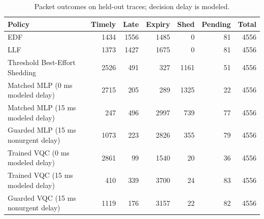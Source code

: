 \begin{table}[t]
\centering
\caption{Packet outcomes on held-out traces; decision delay is modeled.}
\begin{tabular}{lrrrrrr}
\toprule
Policy & Timely & Late & Expiry & Shed & Pending & Total \\
\midrule
EDF & 1434 & 1556 & 1485 & 0 & 81 & 4556 \\
LLF & 1373 & 1427 & 1675 & 0 & 81 & 4556 \\
Threshold Best-Effort Shedding & 2526 & 491 & 327 & 1161 & 51 & 4556 \\
Matched MLP (0 ms modeled delay) & 2715 & 205 & 289 & 1325 & 22 & 4556 \\
Matched MLP (15 ms modeled delay) & 247 & 496 & 2997 & 739 & 77 & 4556 \\
Guarded MLP (15 ms nonurgent delay) & 1073 & 223 & 2826 & 355 & 79 & 4556 \\
Trained VQC (0 ms modeled delay) & 2861 & 99 & 1540 & 20 & 36 & 4556 \\
Trained VQC (15 ms modeled delay) & 410 & 339 & 3700 & 24 & 83 & 4556 \\
Guarded VQC (15 ms nonurgent delay) & 1119 & 176 & 3157 & 22 & 82 & 4556 \\
\bottomrule
\end{tabular}
\end{table}
